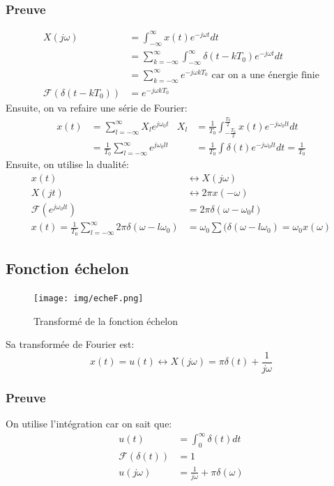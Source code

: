 \documentclass{report}
\begin{document}
\subsubsection{Preuve}
\begin{align*}
X(j\omega) &= \int_{-\infty}^{\infty} x(t) e^{-j \omega t} dt\\
&= \sum_{k = -\infty}^{\infty} \int_{-\infty}^{\infty} \delta(t- kT_0) e^{-j \omega t} dt\\
&= \sum_{k = -\infty}^{\infty} e^{-j \omega k T_0} \text{ car on a une énergie finie}\\
\mathcal{F}(\delta(t-kT_0)) &= e^{-j\omega k T_0}
\end{align*}
Ensuite, on va refaire une série de Fourier:
\begin{align*}
x(t) &= \sum_{l = -\infty}^{\infty} X_l e^{j\omega_0 t} & X_l &=  \frac{1}{T_0} \int_{-\frac{T_0}{2}}^{\frac{T_0}{2}} x(t) e^{-j \omega_0 lt} dt\\
&= \frac{1}{T_0} \sum_{l = -\infty}^{\infty} e^{j\omega_0 lt} & &= \frac{1}{T_0} \int \delta(t) e^{-j \omega_0 lt} dt= \frac{1}{T_0}
\end{align*} %
Ensuite, on utilise la dualité:
\begin{align*}
x(t) &\longleftrightarrow X(j\omega)\\
X(jt) &\longleftrightarrow 2\pi x(-\omega)\\
\mathcal{F}(e^{j\omega_0 lt}) &= 2 \pi \delta(\omega - \omega_0 l)\\
x(t) = \frac{1}{T_0} \sum_{l = - \infty}^{\infty} 2 \pi \delta(\omega - l \omega_0) &= \omega_0 \sum (\delta(\omega -l \omega_0) = \omega_0 x(\omega)
\end{align*}

\subsection{Fonction échelon}
\begin{figure}[H]
\centering
\texttt{[image: img/echeF.png]}
\caption{Transformé de la fonction échelon}
\end{figure}
Sa transformée de Fourier est:
\begin{equation}
x(t) = u(t) \longleftrightarrow X(j\omega) = \pi \delta(t) + \frac{1}{j \omega}
\end{equation}

\subsubsection{Preuve}
On utilise l'intégration car on sait que:
\begin{align*}
u(t) &=  \int_0^{\infty} \delta(t) dt\\
\mathcal{F}(\delta(t)) &= 1\\
u(j\omega) &= \frac{1}{j \omega} + \pi \delta(\omega)
\end{align*}
\end{document}
